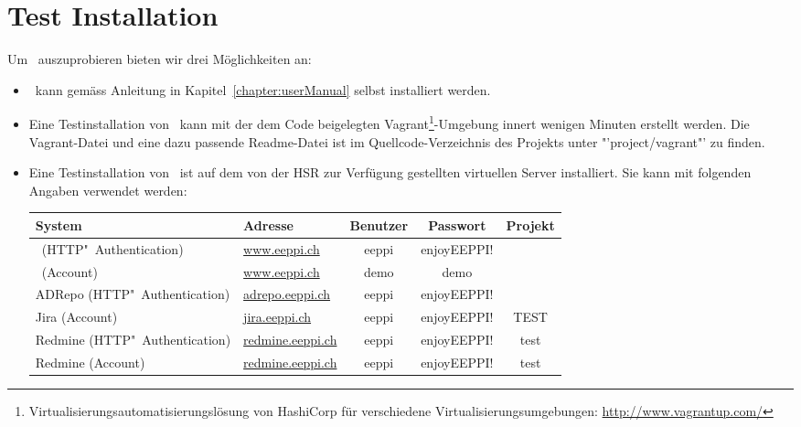 \chapter*{Test Installation}
Um \eeppi\ auszuprobieren bieten wir drei Möglichkeiten an:
\begin{itemize}
	\item \eeppi\ kann gemäss Anleitung in Kapitel\ \ref{chapter:userManual} selbst installiert werden.
	\item Eine Testinstallation von \eeppi\ kann mit der dem Code beigelegten Vagrant\footnote{Virtualisierungsautomatisierungslösung von HashiCorp für verschiedene Virtualisierungsumgebungen: \url{http://www.vagrantup.com/}}-Umgebung innert wenigen Minuten erstellt werden.
	Die Vagrant-Datei und eine dazu passende Readme-Datei ist im Quellcode-Verzeichnis des Projekts unter "'project/vagrant"' zu finden.
	\item Eine Testinstallation von \eeppi\ ist auf dem von der HSR zur Verfügung gestellten virtuellen Server installiert.
	Sie kann mit folgenden Angaben verwendet werden: \newline
	\begin{tabularx}{\linewidth}{| X | l | c | c | c |}
	\hline
	\textbf{System} & \textbf{Adresse} & \textbf{Benutzer} & \textbf{Passwort} & \textbf{Projekt} \\ \hline \hline
	
	\eeppi\ (HTTP"~Authentication) &
		\href{http://eeppi:enjoyEEPPI!@www.eeppi.ch}{www.eeppi.ch} &
		eeppi & enjoyEEPPI! & \\ \hline
	
	\eeppi\ (Account) &
		\href{http://eeppi:enjoyEEPPI!@www.eeppi.ch}{www.eeppi.ch} &
		demo & demo & \\ \hline
	
	ADRepo (HTTP"~Authentication) &
		\href{http://eeppi:enjoyEEPPI!@adrepo.eeppi.ch}{adrepo.eeppi.ch} &
		eeppi & enjoyEEPPI! & \\ \hline
	
	Jira (Account) &
		\href{http://jira.eeppi.ch}{jira.eeppi.ch} &
		eeppi & enjoyEEPPI! & TEST \\ \hline
	
	Redmine (HTTP"~Authentication) &
		\href{http://eeppi:enjoyEEPPI!@redmine.eeppi.ch}{redmine.eeppi.ch} &
		eeppi & enjoyEEPPI! & test \\ \hline
	
	Redmine (Account) &
		\href{http://eeppi:enjoyEEPPI!@redmine.eeppi.ch}{redmine.eeppi.ch} &
		eeppi & enjoyEEPPI! & test \\ \hline
	\end{tabularx}
\end{itemize}
